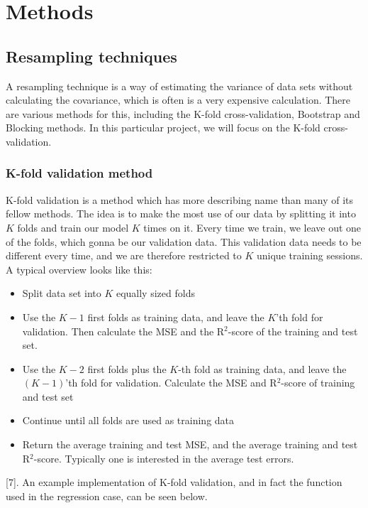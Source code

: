 \section{Methods} \label{sec:methods}

\subsection{Resampling techniques} \label{sec:resampling}
A resampling technique is a way of estimating the variance of data sets without calculating the covariance, which is often is a very expensive calculation. There are various methods for this, including the K-fold cross-validation, Bootstrap and Blocking methods. In this particular project, we will focus on the K-fold cross-validation.

\subsubsection{K-fold validation method} \label{sec:kfold}
K-fold validation is a method which has more describing name than many of its fellow methods. The idea is to make the most use of our data by splitting it into $K$ folds and train our model $K$ times on it. Every time we train, we leave out one of the folds, which gonna be our validation data. This validation data needs to be different every time, and we are therefore restricted to $K$ unique training sessions. A typical overview looks like this:
\begin{itemize}
	\item Split data set into $K$ equally sized folds
	\item Use the $K-1$ first folds as training data, and leave the $K$'th fold for validation. Then calculate the MSE and the R$^2$-score of the training and test set.
	\item Use the $K-2$ first folds plus the $K$-th fold as training data, and leave the $(K-1)$'th fold for validation. Calculate the MSE and R$^2$-score of training and test set
	\item Continue until all folds are used as training data
	\item Return the average training and test MSE, and the average training and test R$^2$-score. Typically one is interested in the average test errors. 
\end{itemize}
[7]. An example implementation of K-fold validation, and in fact the function used in the regression case, can be seen below.

